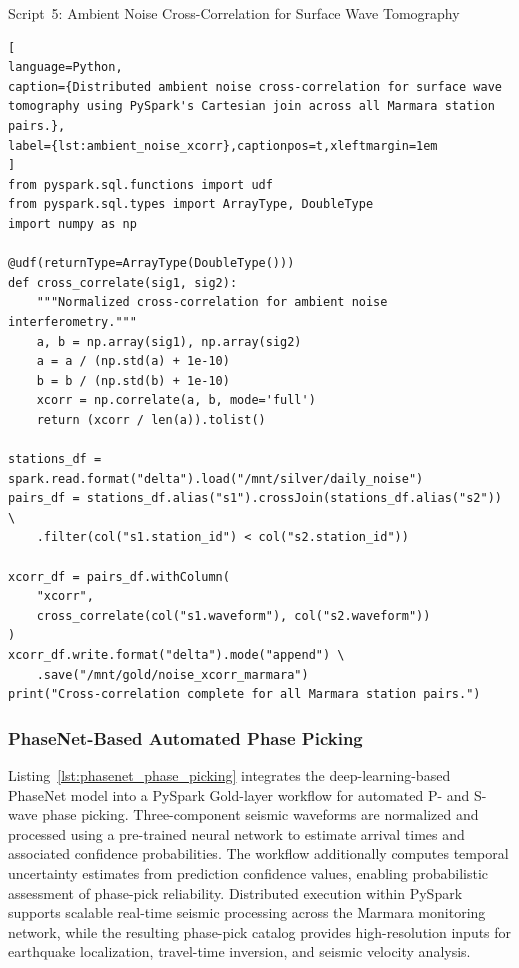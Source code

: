 \documentclass[data,article,accept,pdftex,moreauthors]{Definitions/mdpi}
\begin{document}
Script~5: Ambient Noise Cross-Correlation for Surface Wave Tomography

\begin{lstlisting}[
language=Python,
caption={Distributed ambient noise cross-correlation for surface wave tomography using PySpark's Cartesian join across all Marmara station pairs.},
label={lst:ambient_noise_xcorr},captionpos=t,xleftmargin=1em
]
from pyspark.sql.functions import udf
from pyspark.sql.types import ArrayType, DoubleType
import numpy as np

@udf(returnType=ArrayType(DoubleType()))
def cross_correlate(sig1, sig2):
    """Normalized cross-correlation for ambient noise interferometry."""
    a, b = np.array(sig1), np.array(sig2)
    a = a / (np.std(a) + 1e-10)
    b = b / (np.std(b) + 1e-10)
    xcorr = np.correlate(a, b, mode='full')
    return (xcorr / len(a)).tolist()

stations_df = spark.read.format("delta").load("/mnt/silver/daily_noise")
pairs_df = stations_df.alias("s1").crossJoin(stations_df.alias("s2")) \
    .filter(col("s1.station_id") < col("s2.station_id"))

xcorr_df = pairs_df.withColumn(
    "xcorr",
    cross_correlate(col("s1.waveform"), col("s2.waveform"))
)
xcorr_df.write.format("delta").mode("append") \
    .save("/mnt/gold/noise_xcorr_marmara")
print("Cross-correlation complete for all Marmara station pairs.")
\end{lstlisting}

\subsubsection{PhaseNet-Based Automated Phase Picking}

Listing~\ref{lst:phasenet_phase_picking} integrates the deep-learning-based PhaseNet model into a PySpark Gold-layer workflow for automated P- and S-wave phase picking. Three-component seismic waveforms are normalized and processed using a pre-trained neural network to estimate arrival times and associated confidence probabilities. The workflow additionally computes temporal uncertainty estimates from prediction confidence values, enabling probabilistic assessment of phase-pick reliability. Distributed execution within PySpark supports scalable real-time seismic processing across the Marmara monitoring network, while the resulting phase-pick catalog provides high-resolution inputs for earthquake localization, travel-time inversion, and seismic velocity analysis.
\end{document}
